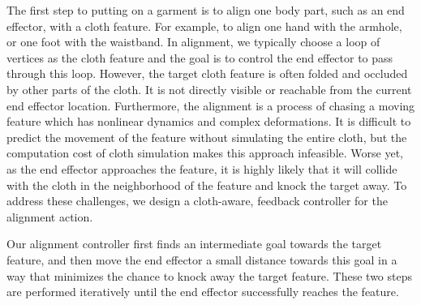 The first step to putting on a garment is to align one body part, such as an end effector, with a cloth feature. For example, to align one hand with the armhole, or one foot with the waistband. In alignment, we typically choose a loop of vertices as the cloth feature and the goal is to control the end effector to pass through this loop. However, the target cloth feature is often folded and occluded by other parts of the cloth. It is not directly visible or reachable from the current end effector location. Furthermore, the alignment is a process of chasing a moving feature which has nonlinear dynamics and complex deformations. It is difficult to predict the movement of the feature without simulating the entire cloth, but the computation cost of cloth simulation makes this approach infeasible. Worse yet, as the end effector approaches the feature, it is highly likely that it will collide with the cloth in the neighborhood of the feature and knock the target away.  To address these challenges, we design a cloth-aware, feedback controller for the alignment action.

Our alignment controller first finds an intermediate goal towards the target feature, and then move the end effector a small distance towards this goal in a way that minimizes the chance to knock away the target feature. These two steps are performed iteratively until the end effector successfully reaches the feature. 


